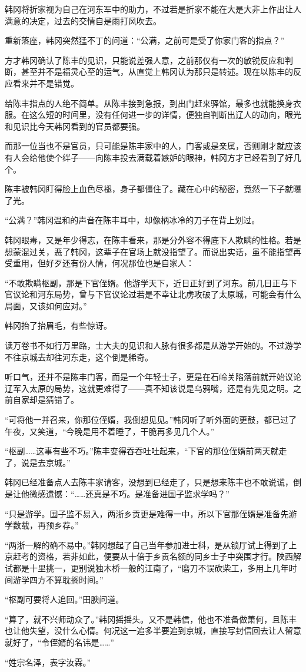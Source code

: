 韩冈将折家视为自己在河东军中的助力，不过若是折家不能在大是大非上作出让人满意的决定，过去的交情自是雨打风吹去。

重新落座，韩冈突然猛不丁的问道：“公满，之前可是受了你家门客的指点？”

方才韩冈确认了陈丰的见识，只能说差强人意，之前那仅有一次的敏锐反应和判断，甚至并不是福灵心至的运气，从直觉上韩冈认为那只是转述。现在以陈丰的反应看来并不是错觉。

给陈丰指点的人绝不简单。从陈丰接到急报，到出门赶来驿馆，最多也就能换身衣服。在这么短的时间里，没有任何进一步的详情，便独自判断出辽人的动向，眼光和见识比今天韩冈看到的官员都要强。

而那一位当也不是官员，只可能是陈丰家中的人，门客或是亲属，否则刚才就应该有人会给他使个绊子——向陈丰投去满载着嫉妒的眼神，韩冈方才已经看到了好几个。

陈丰被韩冈盯得脸上血色尽褪，身子都僵住了。藏在心中的秘密，竟然一下子就曝了光。

“公满？”韩冈温和的声音在陈丰耳中，却像柄冰冷的刀子在背上划过。

韩冈眼毒，又是年少得志，在陈丰看来，那是分外容不得底下人欺瞒的性格。若是想蒙混过关，恶了韩冈，这辈子在官场上就没指望了。而说出实话，虽不能指望再受重用，但好歹还有份人情，何况那位也是自家人：

“不敢欺瞒枢副，那是下官侄婿。他游学天下，近日正好到了河东。前几日正与下官议论和河东局势，曾与下官议论过若是不幸让北虏攻破了太原城，可能会有什么局面，又该如何应对。”

韩冈抬了抬眉毛，有些惊讶。

读万卷书不如行万里路，士大夫的见识和人脉有很多都是从游学开始的。不过游学不往京城去却往河东走，这个倒是稀奇。

听口气，还并不是陈丰门客，而是一个年轻士子，更是在石岭关陷落前就开始议论辽军入太原的局势，这就更难得了——真不知该说是乌鸦嘴，还是有先见之明。之前自家却是猜错了。

“可将他一并召来，你那位侄婿，我倒想见见。”韩冈听了听外面的更鼓，都已过了午夜，又笑道，“今晚是用不着睡了，干脆再多见几个人。”

“枢副……这事有些不巧。”陈丰变得吞吞吐吐起来，“下官的那位侄婿前两天就走了，说是去京城。”

韩冈已经准备点人去陈丰家请客，没想到已经走了，只是想来陈丰也不敢说谎，倒是让他微感遗憾：“……还真是不巧。是准备进国子监求学吗？”

“只是游学。国子监不易入，两浙乡贡更是难得一中，所以下官那侄婿是准备先游学数载，再预乡荐。”

“两浙一解的确不易中。”韩冈想起了自己当年参加进士科，是从锁厅试上得到了上京赶考的资格，若非如此，便要从十倍于乡贡名额的同乡士子中突围才行。陕西解试都是十里挑一，更别说独木桥一般的江南了，“磨刀不误砍柴工，多用上几年时间游学四方不算耽搁时间。”

“枢副可要将人追回。”田腴问道。

“算了，就不兴师动众了。”韩冈摇摇头。又不是韩信，他也不准备做萧何，且陈丰也让他失望，没什么心情。何况这一追多半要追到京城，直接写封信回去让人留意就好了，“令侄婿的名讳是……”

“姓宗名泽，表字汝霖。”

